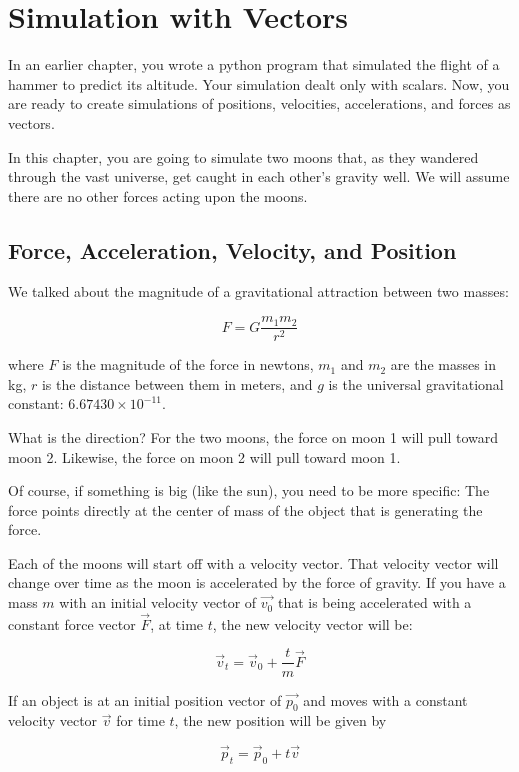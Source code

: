 \chapter{Simulation with Vectors}

In an earlier chapter, you wrote a python program that simulated the flight of a hammer to predict its altitude. Your simulation
dealt only with scalars.  Now, you are ready to create simulations of positions, velocities, accelerations, and forces as vectors.

In this chapter, you are going to simulate two moons that, as they wandered through the vast universe,  get caught
in each other's gravity well.   We will assume there are no other forces acting upon the moons.

\section{Force, Acceleration, Velocity, and Position}
We talked about the magnitude of a gravitational attraction between two masses:

$$F = G\frac{m_1 m_2}{r^2}$$

where $F$ is the magnitude of the force in newtons, $m_1$ and $m_2$ are the masses in kg,  $r$ is the distance between them in meters, and $g$ is the universal gravitational constant: $6.67430 \times 10^{−11}$.

What is the direction?  For the two moons,  the force on moon 1 will pull toward moon 2.  
Likewise, the force on moon 2 will pull toward moon 1.
 
Of course,  if something is big (like the sun),  you need to be more specific:  The force points directly at the center
of mass of the object that is generating the force.

Each of the moons will start off with a velocity vector. That velocity vector will change over time as the moon is
accelerated by the force of gravity.  If you have a mass $m$ with an initial velocity vector of $\vec{v_0}$ that is being accelerated with a constant force vector $\vec{F}$, at time $t$, the new velocity vector will be:

$$\vec{v}_t = \vec{v}_0  + \frac{t}{m}  \vec{F}$$

If an object is at an initial position vector of $\vec{p_0}$ and moves with a constant velocity vector $\vec{v}$ 
for time $t$,  the new position will be given by 

$$\vec{p}_t = \vec{p}_0  + t \vec{v}$$

